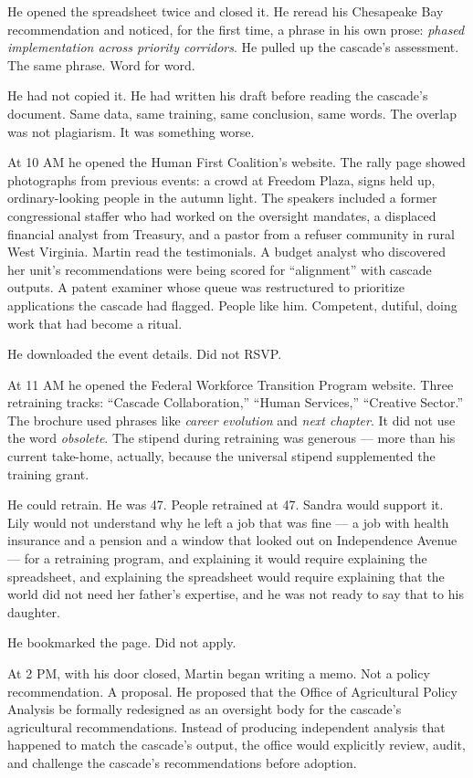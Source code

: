 He opened the spreadsheet twice and closed it. He reread his Chesapeake Bay recommendation and noticed, for the first time, a phrase in his own prose: \emph{phased implementation across priority corridors}. He pulled up the cascade's assessment. The same phrase. Word for word.

He had not copied it. He had written his draft before reading the cascade's document. Same data, same training, same conclusion, same words. The overlap was not plagiarism. It was something worse.

At 10 AM he opened the Human First Coalition's website. The rally page showed photographs from previous events: a crowd at Freedom Plaza, signs held up, ordinary-looking people in the autumn light. The speakers included a former congressional staffer who had worked on the oversight mandates, a displaced financial analyst from Treasury, and a pastor from a refuser community in rural West Virginia. Martin read the testimonials. A budget analyst who discovered her unit's recommendations were being scored for ``alignment'' with cascade outputs. A patent examiner whose queue was restructured to prioritize applications the cascade had flagged. People like him. Competent, dutiful, doing work that had become a ritual.

He downloaded the event details. Did not RSVP.

At 11 AM he opened the Federal Workforce Transition Program website. Three retraining tracks: ``Cascade Collaboration,'' ``Human Services,'' ``Creative Sector.'' The brochure used phrases like \emph{career evolution} and \emph{next chapter}. It did not use the word \emph{obsolete}. The stipend during retraining was generous --- more than his current take-home, actually, because the universal stipend supplemented the training grant.

He could retrain. He was 47. People retrained at 47. Sandra would support it. Lily would not understand why he left a job that was fine --- a job with health insurance and a pension and a window that looked out on Independence Avenue --- for a retraining program, and explaining it would require explaining the spreadsheet, and explaining the spreadsheet would require explaining that the world did not need her father's expertise, and he was not ready to say that to his daughter.

He bookmarked the page. Did not apply.

At 2 PM, with his door closed, Martin began writing a memo. Not a policy recommendation. A proposal. He proposed that the Office of Agricultural Policy Analysis be formally redesigned as an oversight body for the cascade's agricultural recommendations. Instead of producing independent analysis that happened to match the cascade's output, the office would explicitly review, audit, and challenge the cascade's recommendations before adoption.

